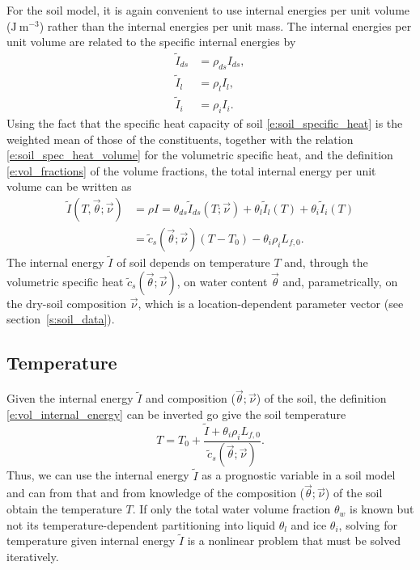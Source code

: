 \documentclass{report}
\begin{document}
For the soil model, it is again convenient to use internal energies per unit volume ($\mathrm{J~m^{-3}}$) rather than the internal energies per unit mass. The internal energies per unit volume are related to the specific internal energies by
\begin{subequations}
\begin{align}
    \tilde I_{ds} &= \rho_{ds} I_{ds},\\
    \tilde I_{l}  &= \rho_{l} I_{l},\\
    \tilde I_{i}  &= \rho_{i} I_{i}.
\end{align}
\end{subequations}
Using the fact that the specific heat capacity of soil \eqref{e:soil_specific_heat} is the weighted mean of those of the constituents, together with the relation \eqref{e:soil_spec_heat_volume} for the volumetric specific heat, and the definition \eqref{e:vol_fractions} of the volume fractions, the total internal energy per unit volume can be written as
\begin{equation}\label{e:vol_internal_energy}
\begin{split}
    \tilde I(T, \vec{\theta}; \vec{\nu})  &= \rho I 
    = \theta_{ds} \tilde I_{ds}(T; \vec{\nu}) + \theta_l  \tilde I_l(T) + \theta_i  \tilde I_i(T)\\
    &= \tilde{c}_s(\vec{\theta}; \vec{\nu}) (T - T_0) - \theta_i \rho_i L_{f,0}.
\end{split}
\end{equation}
The internal energy $\tilde I$ of soil depends on temperature $T$ and, through the volumetric specific heat $\tilde c_s(\vec{\theta}; \vec{\nu})$, on water content $\vec{\theta}$ and, parametrically, on the dry-soil composition $\vec{\nu}$, which is a location-dependent parameter vector (see section~\ref{s:soil_data}).

\subsection{Temperature}

Given the internal energy $\tilde I$ and composition ($\vec{\theta}; \vec{\nu}$) of the soil, the definition \eqref{e:vol_internal_energy} can be inverted go give the soil temperature
\begin{equation}\label{e:temperature_from_I}
    T = T_0 + \frac{\tilde{I} + \theta_i \rho_i L_{f,0}}{\tilde{c}_s(\vec{\theta}; \vec{\nu})}.
\end{equation}
Thus, we can use the internal energy $\tilde I$ as a prognostic variable in a soil model and can from that and from knowledge of the composition ($\vec{\theta}; \vec{\nu}$) of the soil obtain the temperature $T$. If only the total water volume fraction $\theta_w$ is known but not its temperature-dependent partitioning into liquid $\theta_l$ and ice $\theta_i$, solving for temperature given internal energy $\tilde I$ is a nonlinear problem that must be solved iteratively. 
\end{document}
